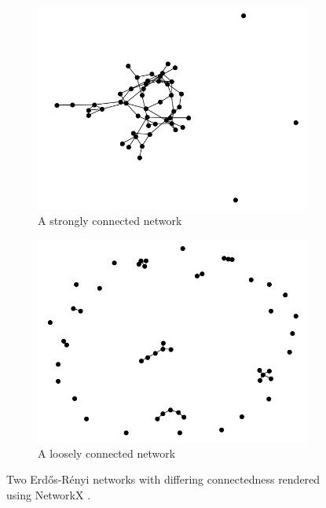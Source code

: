\begin{figure}
    \begin{center}
        \begin{subfigure}[b]{0.45\textwidth}
            \includegraphics[width=\textwidth]{img/2/high_prob}
            \caption{A strongly connected network}
            \label{fig:strongly_connected_network}
        \end{subfigure}
        \begin{subfigure}[b]{0.45\textwidth}
            \includegraphics[width=\textwidth]{img/2/low_prob}
            \caption{A loosely connected network}
            \label{fig:loosely_connected_network}
        \end{subfigure}
    \end{center}
    \caption{Two Erd\H{o}s-R\'{e}nyi \cite{erdos59a}  networks with differing connectedness rendered using NetworkX \cite{SciPyProceedings_11}.}
    \label{fig:connectivity_strengths}
\end{figure}

